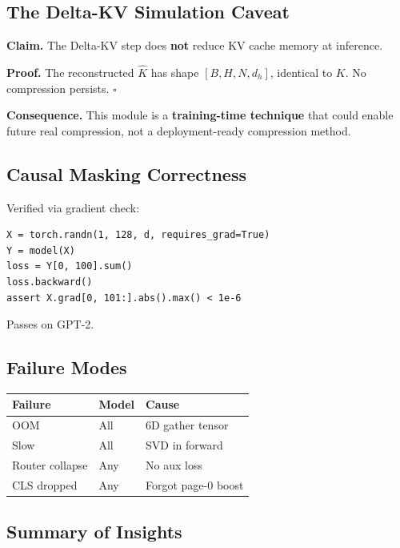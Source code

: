 \subsection{The Delta-KV Simulation Caveat}

\textbf{Claim.} The Delta-KV step does \textbf{not} reduce KV cache memory at inference.

\textbf{Proof.} The reconstructed $\hat{K}$ has shape $[B, H, N, d_h]$, identical 
to $K$. No compression persists. $\square$

\textbf{Consequence.} This module is a \textbf{training-time technique} that could 
enable future real compression, not a deployment-ready compression method.

\subsection{Causal Masking Correctness}

Verified via gradient check:

\begin{lstlisting}
X = torch.randn(1, 128, d, requires_grad=True)
Y = model(X)
loss = Y[0, 100].sum()
loss.backward()
assert X.grad[0, 101:].abs().max() < 1e-6
\end{lstlisting}

Passes on GPT-2.

\subsection{Failure Modes}

\begin{table}[H]
\centering
\small
\begin{tabular}{lll}
\toprule
\textbf{Failure} & \textbf{Model} & \textbf{Cause} \\
\midrule
OOM & All & 6D gather tensor \\
Slow & All & SVD in forward \\
Router collapse & Any & No aux loss \\
CLS dropped & Any & Forgot page-0 boost \\
\bottomrule
\end{tabular}
\end{table}

\subsection{Summary of Insights}

